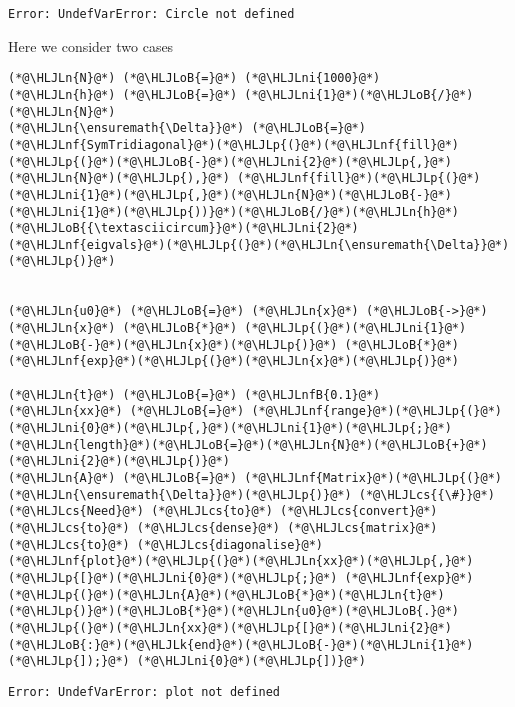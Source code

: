 \documentclass[12pt,a4paper]{article}
\newcommand{\HLJLk}[1]{\textcolor[RGB]{148,91,176}{\textbf{#1}}}
\newcommand{\HLJLn}[1]{#1}
\newcommand{\HLJLnf}[1]{\textcolor[RGB]{66,102,213}{#1}}
\newcommand{\HLJLnfB}[1]{\textcolor[RGB]{59,151,46}{#1}}
\newcommand{\HLJLni}[1]{\textcolor[RGB]{59,151,46}{#1}}
\newcommand{\HLJLoB}[1]{\textcolor[RGB]{102,102,102}{\textbf{#1}}}
\newcommand{\HLJLp}[1]{#1}
\newcommand{\HLJLcs}[1]{\textcolor[RGB]{153,153,119}{\textit{#1}}}
\begin{document}
\begin{lstlisting}
Error: UndefVarError: Circle not defined
\end{lstlisting}


Here we consider two cases


\begin{lstlisting}
(*@\HLJLn{N}@*) (*@\HLJLoB{=}@*) (*@\HLJLni{1000}@*)
(*@\HLJLn{h}@*) (*@\HLJLoB{=}@*) (*@\HLJLni{1}@*)(*@\HLJLoB{/}@*)(*@\HLJLn{N}@*)
(*@\HLJLn{\ensuremath{\Delta}}@*) (*@\HLJLoB{=}@*) (*@\HLJLnf{SymTridiagonal}@*)(*@\HLJLp{(}@*)(*@\HLJLnf{fill}@*)(*@\HLJLp{(}@*)(*@\HLJLoB{-}@*)(*@\HLJLni{2}@*)(*@\HLJLp{,}@*)(*@\HLJLn{N}@*)(*@\HLJLp{),}@*) (*@\HLJLnf{fill}@*)(*@\HLJLp{(}@*)(*@\HLJLni{1}@*)(*@\HLJLp{,}@*)(*@\HLJLn{N}@*)(*@\HLJLoB{-}@*)(*@\HLJLni{1}@*)(*@\HLJLp{))}@*)(*@\HLJLoB{/}@*)(*@\HLJLn{h}@*)(*@\HLJLoB{{\textasciicircum}}@*)(*@\HLJLni{2}@*)
(*@\HLJLnf{eigvals}@*)(*@\HLJLp{(}@*)(*@\HLJLn{\ensuremath{\Delta}}@*)(*@\HLJLp{)}@*)


(*@\HLJLn{u0}@*) (*@\HLJLoB{=}@*) (*@\HLJLn{x}@*) (*@\HLJLoB{->}@*) (*@\HLJLn{x}@*) (*@\HLJLoB{*}@*) (*@\HLJLp{(}@*)(*@\HLJLni{1}@*)(*@\HLJLoB{-}@*)(*@\HLJLn{x}@*)(*@\HLJLp{)}@*) (*@\HLJLoB{*}@*) (*@\HLJLnf{exp}@*)(*@\HLJLp{(}@*)(*@\HLJLn{x}@*)(*@\HLJLp{)}@*)

(*@\HLJLn{t}@*) (*@\HLJLoB{=}@*) (*@\HLJLnfB{0.1}@*)
(*@\HLJLn{xx}@*) (*@\HLJLoB{=}@*) (*@\HLJLnf{range}@*)(*@\HLJLp{(}@*)(*@\HLJLni{0}@*)(*@\HLJLp{,}@*)(*@\HLJLni{1}@*)(*@\HLJLp{;}@*) (*@\HLJLn{length}@*)(*@\HLJLoB{=}@*)(*@\HLJLn{N}@*)(*@\HLJLoB{+}@*)(*@\HLJLni{2}@*)(*@\HLJLp{)}@*)
(*@\HLJLn{A}@*) (*@\HLJLoB{=}@*) (*@\HLJLnf{Matrix}@*)(*@\HLJLp{(}@*)(*@\HLJLn{\ensuremath{\Delta}}@*)(*@\HLJLp{)}@*) (*@\HLJLcs{{\#}}@*) (*@\HLJLcs{Need}@*) (*@\HLJLcs{to}@*) (*@\HLJLcs{convert}@*) (*@\HLJLcs{to}@*) (*@\HLJLcs{dense}@*) (*@\HLJLcs{matrix}@*) (*@\HLJLcs{to}@*) (*@\HLJLcs{diagonalise}@*)
(*@\HLJLnf{plot}@*)(*@\HLJLp{(}@*)(*@\HLJLn{xx}@*)(*@\HLJLp{,}@*) (*@\HLJLp{[}@*)(*@\HLJLni{0}@*)(*@\HLJLp{;}@*) (*@\HLJLnf{exp}@*)(*@\HLJLp{(}@*)(*@\HLJLn{A}@*)(*@\HLJLoB{*}@*)(*@\HLJLn{t}@*)(*@\HLJLp{)}@*)(*@\HLJLoB{*}@*)(*@\HLJLn{u0}@*)(*@\HLJLoB{.}@*)(*@\HLJLp{(}@*)(*@\HLJLn{xx}@*)(*@\HLJLp{[}@*)(*@\HLJLni{2}@*)(*@\HLJLoB{:}@*)(*@\HLJLk{end}@*)(*@\HLJLoB{-}@*)(*@\HLJLni{1}@*)(*@\HLJLp{]);}@*) (*@\HLJLni{0}@*)(*@\HLJLp{])}@*)
\end{lstlisting}

\begin{lstlisting}
Error: UndefVarError: plot not defined
\end{lstlisting}
\end{document}
